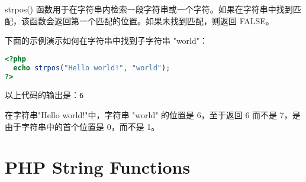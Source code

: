 strpos() 函数用于在字符串内检索一段字符串或一个字符。如果在字符串中找到匹配，该函数会返回第一个匹配的位置。如果未找到匹配，则返回 FALSE。

下面的示例演示如何在字符串中找到子字符串 "world"：



\begin{lstlisting}[language=PHP]
<?php
  echo strpos("Hello world!", "world");
?>
\end{lstlisting}

以上代码的输出是：\verb|6|

在字符串"Hello world!"中，字符串 "world" 的位置是 6，至于返回 6 而不是 7，是由于字符串中的首个位置是 0，而不是 1。


\section{PHP String Functions}



